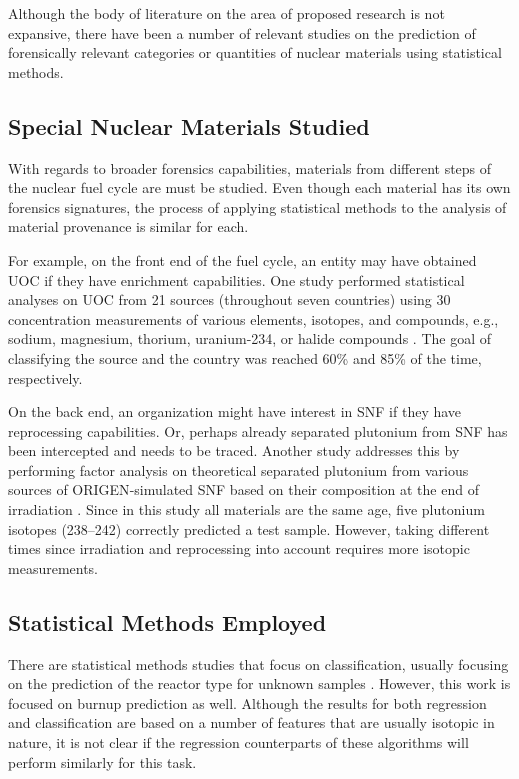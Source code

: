 Although the body of literature on the area of proposed research is not
expansive, there have been a number of relevant studies on the prediction of
forensically relevant categories or quantities of nuclear materials using
statistical methods. 

\subsection{Special Nuclear Materials Studied}

With regards to broader forensics capabilities, materials from different steps
of the nuclear fuel cycle are must be studied.  Even though each material has
its own forensics signatures, the process of applying statistical methods to
the analysis of material provenance is similar for each. 

For example, on the front end of the fuel cycle, an entity may have obtained
\gls{UOC} if they have enrichment capabilities.  One study performed
statistical analyses on \gls{UOC} from 21 sources (throughout seven countries)
using 30 concentration measurements of various elements, isotopes, and
compounds, e.g., sodium, magnesium, thorium, uranium-234, or halide compounds
\cite{robel_2009}.  The goal of classifying the source and the country was
reached 60\% and 85\% of the time, respectively.  

On the back end, an organization might have interest in \gls{SNF} if they have
reprocessing capabilities.  Or, perhaps already separated plutonium from
\gls{SNF} has been intercepted and needs to be traced. Another study addresses
this by performing factor analysis on theoretical separated plutonium from
various sources of \gls{ORIGEN}-simulated \gls{SNF} based on their composition
at the end of irradiation \cite{nicolaou_pu}.  Since in this study all
materials are the same age, five plutonium isotopes (238--242) correctly
predicted a test sample. However, taking different times since irradiation and
reprocessing into account requires more isotopic measurements. 

\subsection{Statistical Methods Employed}

There are statistical methods studies that focus on classification, usually
focusing on the prediction of the reactor type for unknown samples
\cite{robel_2009, nicolaou_pu, jones_snf_2014, nicolaou_2009}.  However, this
work is focused on burnup prediction as well.  Although the results for both
regression and classification are based on a number of features that are
usually isotopic in nature, it is not clear if the regression counterparts of
these algorithms will perform similarly for this task. 


